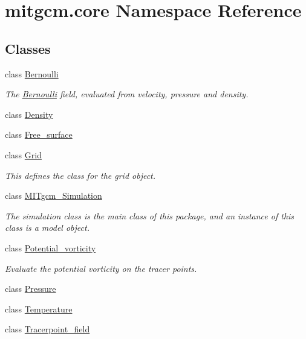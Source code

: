 \hypertarget{namespacemitgcm_1_1core}{\section{mitgcm.\+core Namespace Reference}
\label{namespacemitgcm_1_1core}
}
\subsection*{Classes}
\begin{DoxyCompactItemize}
\item 
class \hyperlink{classmitgcm_1_1core_1_1Bernoulli}{Bernoulli}
\begin{DoxyCompactList}\small\item\em The \hyperlink{classmitgcm_1_1core_1_1Bernoulli}{Bernoulli} field, evaluated from velocity, pressure and density. \end{DoxyCompactList}\item 
class \hyperlink{classmitgcm_1_1core_1_1Density}{Density}
\item 
class \hyperlink{classmitgcm_1_1core_1_1Free__surface}{Free\+\_\+surface}
\item 
class \hyperlink{classmitgcm_1_1core_1_1Grid}{Grid}
\begin{DoxyCompactList}\small\item\em This defines the class for the grid object. \end{DoxyCompactList}\item 
class \hyperlink{classmitgcm_1_1core_1_1MITgcm__Simulation}{M\+I\+Tgcm\+\_\+\+Simulation}
\begin{DoxyCompactList}\small\item\em The simulation class is the main class of this package, and an instance of this class is a model object. \end{DoxyCompactList}\item 
class \hyperlink{classmitgcm_1_1core_1_1Potential__vorticity}{Potential\+\_\+vorticity}
\begin{DoxyCompactList}\small\item\em Evaluate the potential vorticity on the tracer points. \end{DoxyCompactList}\item 
class \hyperlink{classmitgcm_1_1core_1_1Pressure}{Pressure}
\item 
class \hyperlink{classmitgcm_1_1core_1_1Temperature}{Temperature}
\item 
class \hyperlink{classmitgcm_1_1core_1_1Tracerpoint__field}{Tracerpoint\+\_\+field}

\end{DoxyCompactItemize}
